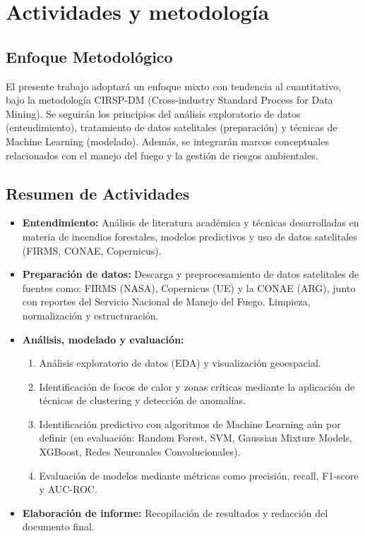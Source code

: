 \section{Actividades y metodología}
\subsection{Enfoque Metodológico}
El presente trabajo adoptará un enfoque mixto con tendencia al cuantitativo, bajo la metodología CIRSP-DM (Cross-industry Standard Process for Data Mining). Se seguirán los principios del análisis exploratorio de datos (entendimiento), tratamiento de datos satelitales (preparación) y técnicas de Machine Learning (modelado). Además, se integrarán marcos conceptuales relacionados con el manejo del fuego y la gestión de riesgos ambientales.
\subsection{Resumen de Actividades}
\begin{itemize}
    \item \textbf{Entendimiento:} Análisis de literatura académica y técnicas desarrolladas en materia de incendios forestales, modelos predictivos y uso de datos satelitales (FIRMS, CONAE, Copernicus). \\ 
    \item \textbf{Preparación de datos:} Descarga y preprocesamiento de datos satelitales de fuentes como: FIRMS (NASA), Copernicus (UE) y la CONAE (ARG), junto con reportes del Servicio Nacional de Manejo del Fuego. Limpieza, normalización y estructuración. \\
    \item \textbf{Análisis, modelado y evaluación:} 
        \begin{enumerate}
            \item Análisis exploratorio de datos (EDA) y visualización geoespacial.  
            \item Identificación de focos de calor y zonas críticas mediante la aplicación de técnicas de clustering y detección de anomalías.  
            \item Identificación predictivo con algoritmos de Machine Learning aún por definir (en evaluación: Random Forest, SVM, Gaussian Mixture Models, XGBoost, Redes Neuronales Convolucionales).
            \item Evaluación de modelos mediante métricas como precisión, recall, F1-score y AUC-ROC. \\
        \end{enumerate}
    \item \textbf{Elaboración de informe:} Recopilación de resultados y redacción del documento final.  
\end{itemize}